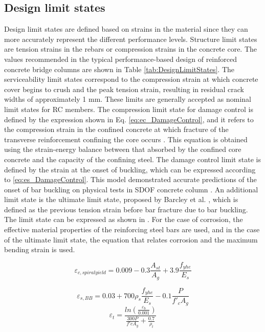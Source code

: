 \subsection{Design limit states}
Design limit states are defined based on strains in the material since they can more accurately represent the different performance levels. Structure limit states are tension strains in the rebars or compression strains in the concrete core. The values recommended in the typical performance-based design of reinforced concrete bridge columns are shown in Table  \ref{tab:DesignLimitStates}. The serviceability limit states correspond to the compression strain at which concrete cover begins to crush and the peak tension strain, resulting in residual crack widths of approximately 1 mm. These limits are generally accepted as nominal limit states for RC members. The compression limit state for damage control is defined by the expression shown in Eq. \ref{eq:ec_DamageControl}, and it refers to the compression strain in the confined concrete at which fracture of the transverse reinforcement confining the core occurs \cite{Priestley2007}. This equation is obtained using the strain-energy balance between that absorbed by the confined core concrete and the capacity of the confining steel. The damage control limit state is defined by the strain at the onset of buckling, which can be expressed according to \ref{eq:es_DamageControl}. This model demonstrated accurate predictions of the onset of bar buckling on physical tests in SDOF concrete column \cite{Goodnight2016}. An additional limit state is the ultimate limit state, proposed by Barcley et al. \cite{Barcley2019}, which is defined as the previous tension strain before bar fracture due to bar buckling. The limit state can be expressed as shown in . For the case of corrosion, the effective material properties of the reinforcing steel bars are used, and in the case of the ultimate limit state, the equation that relates corrosion and the maximum bending strain is used.

\begin{equation}
    \varepsilon_{c,spiral yield}=0.009-0.3\frac{A_{st}}{A_{g}} +3.9\frac{f_{yhe}}{E_{s}}
    \label{eq:ec_DamageControl}
\end{equation}

\begin{equation}
    \varepsilon_{s,BB}=0.03+700\rho_{s}  \frac{f_{yhe}}{E_{s}} -0.1\frac{P}{f'_{c}A_{g}}
    \label{eq:es_DamageControl}
\end{equation}
\begin{equation}
    \varepsilon_{t}=\frac{ln(\frac{\varepsilon_{b}}{0.001})}{\frac{300P}{f'c A_{g}}+\frac{0.7}{\rho_{t}}}
    \label{eq:es_ultimate}
\end{equation}

